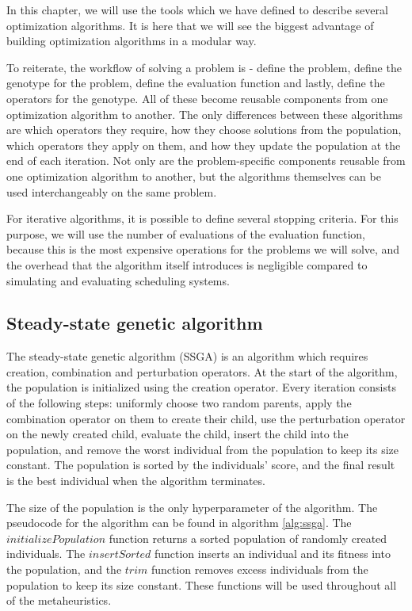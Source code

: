 In this chapter, we will use the tools which we have defined to describe several optimization algorithms. It is here that we will see the biggest advantage of building optimization algorithms in a modular way. 

To reiterate, the workflow of solving a problem is - define the problem, define the genotype for the problem, define the evaluation function and lastly, define the operators for the genotype. All of these become reusable components from one optimization algorithm to another. The only differences between these algorithms are which operators they require, how they choose solutions from the population, which operators they apply on them, and how they update the population at the end of each iteration. Not only are the problem-specific components reusable from one optimization algorithm to another, but the algorithms themselves can be used interchangeably on the same problem.

For iterative algorithms, it is possible to define several stopping criteria. For this purpose, we will use the number of evaluations of the evaluation function, because this is the most expensive operations for the problems we will solve, and the overhead that the algorithm itself introduces is negligible compared to simulating and evaluating scheduling systems.

\subsection{Steady-state genetic algorithm}
\label{sec:ssga}

The steady-state genetic algorithm (SSGA) \citep{ssga} is an algorithm which requires creation, combination and perturbation operators. At the start of the algorithm, the population is initialized using the creation operator. Every iteration consists of the following steps: uniformly choose two random parents, apply the combination operator on them to create their child, use the perturbation operator on the newly created child, evaluate the child, insert the child into the population, and remove the worst individual from the population to keep its size constant. The population is sorted by the individuals' score, and the final result is the best individual when the algorithm terminates.

The size of the population is the only hyperparameter of the algorithm. The pseudocode for the algorithm can be found in algorithm \ref{alg:ssga}. The $initializePopulation$ function returns a sorted population of randomly created individuals. The $insertSorted$ function inserts an individual and its fitness into the population, and the $trim$ function removes excess individuals from the population to keep its size constant. These functions will be used throughout all of the metaheuristics.

